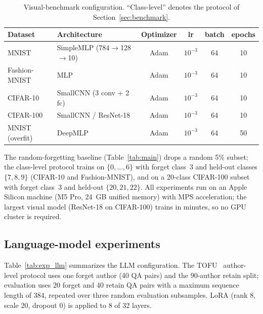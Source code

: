 \documentclass[smallextended]{svjour3}       %
\begin{document}
\begin{table}[t]
\centering
\small
\caption{Visual-benchmark configuration. ``Class-level'' denotes the protocol of Section~\ref{sec:benchmark}.}
\label{tab:exp_vision}
\setlength{\tabcolsep}{2pt}
\begin{tabular}{l l c c c c}
\toprule
Dataset & Architecture & Optimizer & lr & batch & epochs \\
\midrule
MNIST & SimpleMLP (784$\to$128$\to$10) & Adam & $10^{-3}$ & 64 & 10 \\
Fashion-MNIST & MLP & Adam & $10^{-3}$ & 64 & 10 \\
CIFAR-10 & SmallCNN (3 conv + 2 fc) & Adam & $10^{-3}$ & 64 & 10 \\
CIFAR-100 & SmallCNN / ResNet-18 & Adam & $10^{-3}$ & 64 & 10 \\
MNIST (overfit) & DeepMLP & Adam & $10^{-3}$ & 64 & 50 \\
\bottomrule
\end{tabular}
\end{table}

The random-forgetting baseline (Table~\ref{tab:main}) drops a random 5\% subset; the class-level protocol trains on $\{0,\dots,6\}$ with forget class~3 and held-out classes $\{7,8,9\}$ (CIFAR-10 and Fashion-MNIST), and on a 20-class CIFAR-100 subset with forget class~3 and held-out $\{20,21,22\}$. All experiments run on an Apple Silicon machine (M5 Pro, 24~GB unified memory) with MPS acceleration; the largest visual model (ResNet-18 on CIFAR-100) trains in minutes, so no GPU cluster is required.

\subsection{Language-model experiments}

Table~\ref{tab:exp_llm} summarizes the LLM configuration. The TOFU~\cite{maini2024tofu} author-level protocol uses one forget author (40 QA pairs) and the 90-author retain split; evaluation uses 20 forget and 40 retain QA pairs with a maximum sequence length of 384, repeated over three random evaluation subsamples. LoRA (rank 8, scale 20, dropout 0) is applied to 8 of 32 layers.
\end{document}
